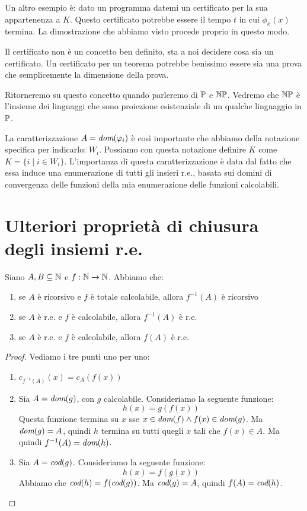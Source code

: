 Un altro esempio è: dato un programma datemi un certificato per la sua appartenenza a $K$. Questo
certificato potrebbe essere il tempo $t$ in cui $\phi_{x}(x)$ termina. La dimostrazione che abbiamo
visto procede proprio in questo modo.

Il certificato non è un concetto ben definito, sta a noi decidere cosa sia un certificato. Un
certificato per un teorema potrebbe benissimo essere sia una prova che semplicemente la dimensione
della prova.

Ritorneremo su questo concetto quando parleremo di $\mathbb{P}$ e $\mathbb{NP}$. Vedremo che $\mathbb{NP}$ è l'insieme dei
linguaggi che sono proiezione esistenziale di un qualche linguaggio in $\mathbb{P}$. 

La caratterizzazione $A = \textit{dom}(\varphi_{i})$ è così importante che abbiamo della notazione specifica per
indicarlo: $W_{i}$. Possiamo con questa notazione definire $K$ come $K = \{i \mid i \in W_{i}\}$.
L'importanza di questa caratterizzazione è data dal fatto che essa induce una enumerazione di tutti
gli insieri r.e., basata sui domini di convergenza delle funzioni della mia enumerazione delle
funzioni calcolabili.

\section{Ulteriori proprietà di chiusura degli insiemi r.e.}

\begin{thm}
    Siano $A,B \subseteq \mathbb{N}$ e $f : \mathbb{N} \to \mathbb{N}$. Abbiamo che:
    \begin{enumerate}
        \item se $A$ è ricorsivo e $f$ è totale calcolabile, allora $f^{-1}(A)$ è ricorsivo
        \item se $A$ è r.e. e $f$ è calcolabile, allora $f^{-1}(A)$ è r.e.
        \item se $A$ è r.e. e $f$ è calcolabile, allora $f(A)$ è r.e.
    \end{enumerate}
\end{thm}
\begin{proof}
    Vediamo i tre punti uno per uno:
    \begin{enumerate}
        \item $c_{f^{-1}(A)}(x) = c_{A}(f(x))$
        \item Sia $A = \textit{dom}(g)$, con $g$ calcolabile. Consideriamo la seguente funzione:
        \begin{equation*}
            h(x) = g(f(x))
        \end{equation*}
        Questa funzione termina su $x$ sse $x \in \textit{dom}(f) \land f(x) \in \textit{dom}(g)$. Ma $\textit{dom}(g) = A$, quindi $h$ termina
        su tutti quegli $x$ tali che $f(x) \in A$. Ma quindi $f^{-1}(A) = \textit{dom}(h)$.
        \item Sia $A = \textit{cod}(g)$. Consideriamo la seguente funzione:
        \begin{equation*}
            h(x) = f(g(x))
        \end{equation*}
        Abbiamo che $\textit{cod}(h) = f(\textit{cod}(g))$. Ma $\textit{cod}(g) = A$, quindi $f(A) = \textit{cod}(h)$.
    \end{enumerate}
\end{proof}

